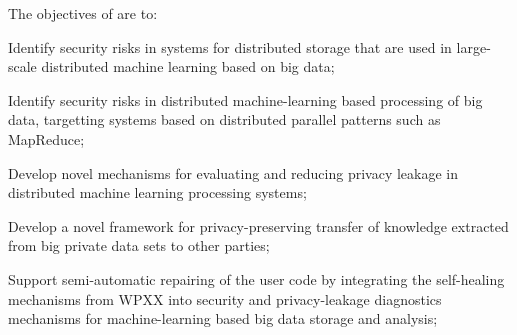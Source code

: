 \addtocounter{wpno}{1}
\begin{Workpackage}{\thewpno}
\WPTitle{\wpname{\thewpno}}

\begin{WPObjectives}
The objectives of \theWP{} are to:
\begin{compactitem}
\item Identify security risks in systems for distributed storage that are used in large-scale distributed machine learning based on big data;
\item Identify security risks in distributed machine-learning based processing of big data, targetting systems based on distributed parallel patterns such as MapReduce;
\item Develop novel mechanisms for evaluating and reducing privacy leakage in distributed machine learning processing systems;
\item Develop a novel framework for privacy-preserving transfer of knowledge extracted from big private data sets to other parties;
\item Support semi-automatic repairing of the user code by integrating the self-healing mechanisms from WPXX into security and privacy-leakage diagnostics mechanisms for machine-learning based big data storage and analysis;
\end{compactitem}
\end{WPObjectives}


\end{Workpackage}
